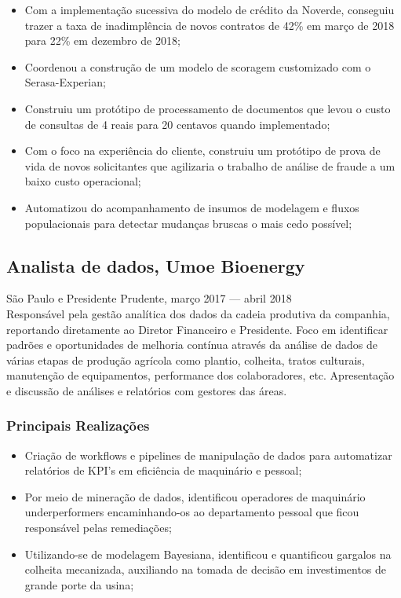 \documentclass{article}
\newcommand{\jobdate}[3]{
\large
\vspace{0.05em} 
  {#1, #2 --- #3}
\vspace{0.5em} 
\\
}
\begin{document}
\begin{itemize}

\item{Com a implementação sucessiva do modelo de crédito da Noverde, conseguiu trazer a taxa de inadimplência de novos contratos de 42\% em março de 2018 para 22\% em dezembro de 2018;}
\item{Coordenou a construção de um modelo de scoragem customizado com o Serasa-Experian;}
\item{Construiu um protótipo de processamento de documentos que levou o custo de consultas de 4 reais para 20 centavos quando implementado;}
\item{Com o foco na experiência do cliente, construiu um protótipo de prova de vida de novos solicitantes que agilizaria o trabalho de análise de fraude a um baixo custo operacional;}
\item{Automatizou do acompanhamento de insumos de modelagem e fluxos populacionais para detectar mudanças bruscas o mais cedo possível;}

\end{itemize}


\subsection{Analista de dados, Umoe Bioenergy}
\jobdate{São Paulo e Presidente Prudente}{março 2017}{abril 2018}
Responsável pela gestão analítica dos dados da cadeia produtiva da companhia, reportando diretamente ao Diretor Financeiro e Presidente. Foco em identificar padrões e oportunidades de melhoria contínua através da análise de dados de várias etapas de produção agrícola como plantio, colheita, tratos culturais, manutenção de equipamentos, performance dos colaboradores, etc. Apresentação e discussão de análises e relatórios com gestores das áreas.

\subsubsection{Principais Realizações}

\begin{itemize}

\item{Criação de workflows e pipelines de manipulação de dados para automatizar relatórios de KPI’s em eficiência de maquinário e pessoal;}
\item{Por meio de mineração de dados, identificou operadores de maquinário underperformers encaminhando-os ao departamento pessoal que ficou responsável pelas remediações;}
\item{Utilizando-se de modelagem Bayesiana, identificou e quantificou gargalos na colheita mecanizada, auxiliando na tomada de decisão em investimentos de grande porte da usina;}

\end{itemize}
\end{document}
